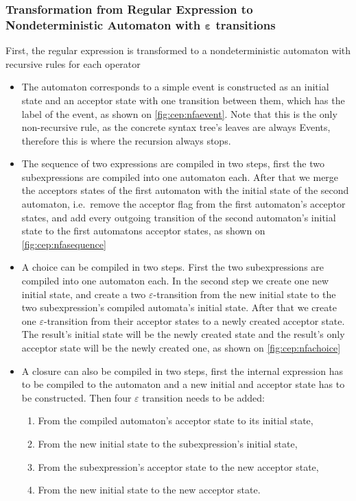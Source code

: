 			\subsubsection{Transformation from Regular Expression to Nondeterministic Automaton with $\bm{\varepsilon}$ transitions}
			\label{section:re2nfa}
			First, the regular expression is transformed to a nondeterministic automaton with recursive rules for each operator
			\begin{itemize}
				\item The automaton corresponds to a simple event is constructed as an initial state and an acceptor state with one transition between them, which has the label of the event, as shown on \cref{fig:cep:nfaevent}. Note that this is the only non-recursive rule, as the concrete syntax tree's leaves are always Events, therefore this is where the recursion always stops.
				\item The sequence of two expressions are compiled in two steps, first the two subexpressions are compiled into one automaton each. After that we merge the acceptors states of the first automaton with the initial state of the second automaton, i.e.~remove the acceptor flag from the first automaton's acceptor states, and add every outgoing transition of the second automaton's initial state to the first automatons acceptor states, as shown on \cref{fig:cep:nfasequence}
				\item A choice can be compiled in two steps. First the two subexpressions are compiled into one automaton each. In the second step we create one new initial state, and create a two $\varepsilon$-transition from the new initial state to the two subexpression's compiled automata's initial state. After that we create one $\varepsilon$-transition from their acceptor states to a newly created acceptor state. The result's initial state will be the newly created state and the result's only acceptor state will be the newly created one, as shown on \cref{fig:cep:nfachoice}
				\item A closure can also be compiled in two steps, first the internal expression has to be compiled to the automaton and a new initial and acceptor state has to be constructed. Then four $\varepsilon$ transition needs to be added:
				\begin{enumerate}
					\item From the compiled automaton's acceptor state to its initial state,
					\item From the new initial state to the subexpression's initial state,
					\item From the subexpression's acceptor state to the new acceptor state,
					\item From the new initial state to the new acceptor state.
				\end{enumerate}
			\end{itemize}
		
